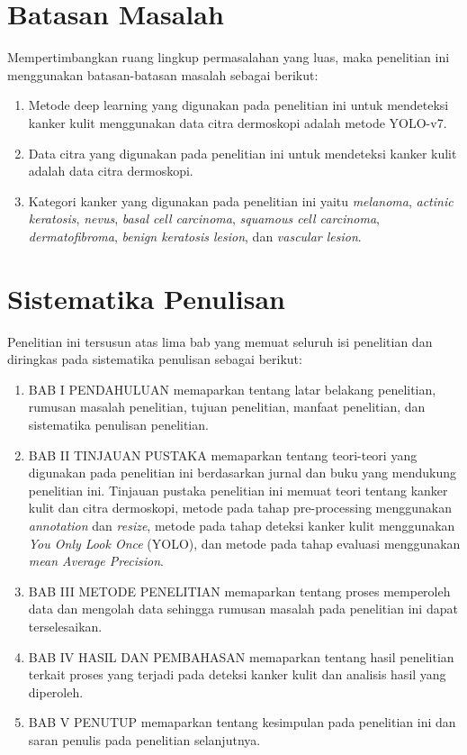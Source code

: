     \section{Batasan Masalah}
    Mempertimbangkan ruang lingkup permasalahan yang luas, maka penelitian ini menggunakan batasan-batasan masalah sebagai berikut:
    \begin{enumerate}
        \item Metode deep learning yang digunakan pada penelitian ini untuk mendeteksi kanker kulit menggunakan data citra dermoskopi adalah metode YOLO-v7.
        \item Data citra yang digunakan pada penelitian ini untuk mendeteksi kanker kulit adalah data citra dermoskopi.
        \item Kategori kanker yang digunakan pada penelitian ini yaitu \textit{melanoma}, \textit{actinic keratosis}, \textit{nevus}, \textit{basal cell carcinoma}, \textit{squamous cell carcinoma}, \textit{dermatofibroma}, \textit{benign keratosis lesion}, dan \textit{vascular lesion}.
    \end{enumerate}

    \section{Sistematika Penulisan}
    Penelitian ini tersusun atas lima bab yang memuat seluruh isi penelitian dan diringkas pada sistematika penulisan sebagai berikut:
    \begin{enumerate}
        \item BAB I PENDAHULUAN
        memaparkan tentang latar belakang penelitian, rumusan masalah penelitian, tujuan penelitian, manfaat penelitian, dan sistematika penulisan penelitian.
        \item BAB II TINJAUAN PUSTAKA
        memaparkan tentang teori-teori yang digunakan pada penelitian ini berdasarkan jurnal dan buku yang mendukung penelitian ini. Tinjauan pustaka penelitian ini memuat teori tentang kanker kulit dan citra dermoskopi, metode pada tahap pre-processing menggunakan \textit{annotation} dan \textit{resize}, metode pada tahap deteksi kanker kulit menggunakan \textit{You Only Look Once} (YOLO), dan metode pada tahap evaluasi menggunakan \textit{mean Average Precision}.
        \item BAB III METODE PENELITIAN 
        memaparkan tentang proses memperoleh data dan mengolah data sehingga rumusan masalah pada penelitian ini dapat terselesaikan.
        \item BAB IV HASIL DAN PEMBAHASAN
        memaparkan tentang hasil penelitian terkait proses yang terjadi pada deteksi kanker kulit dan analisis hasil yang diperoleh.
        \item BAB V PENUTUP
        memaparkan tentang kesimpulan pada penelitian ini dan saran penulis pada penelitian selanjutnya.
    \end{enumerate}